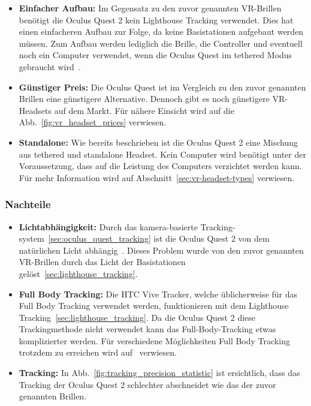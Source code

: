 \begin{itemize}
    \item \textbf{Einfacher Aufbau:} Im Gegensatz zu den zuvor genannten VR-Brillen benötigt die Oculus Quest 2 kein Lighthouse Tracking verwendet.
    Dies hat einen einfacheren Aufbau zur Folge, da keine Basistationen aufgebaut werden müssen.
    Zum Aufbau werden lediglich die Brille, die Controller und eventuell noch ein Computer verwendet, wenn die Oculus Quest im tethered Modus gebraucht wird~\cite{MECHATECH}.
    \item \textbf{Günstiger Preis:} Die Oculus Quest ist im Vergleich zu den zuvor genannten Brillen eine günstigere Alternative.
    Dennoch gibt es noch günstigere VR-Headsets auf dem Markt.
    Für nähere Einsicht wird auf die Abb.~\ref{fig:vr_headset_prices} verwiesen.
    \item \textbf{Standalone:} Wie bereits beschrieben ist die Oculus Quest 2 eine Mischung aus tethered und standalone Headset.
    Kein Computer wird benötigt unter der Voraussetzung, dass auf die Leistung des Computers verzichtet werden kann.
    Für mehr Information wird auf Abschnitt~\ref{sec:vr-headset-types} verwiesen.
\end{itemize}

\subsubsection{Nachteile}

\begin{itemize}
    \item \textbf{Lichtabhängigkeit:} Durch das kamera-basierte Tracking-system~\ref{sec:oculus_quest_tracking} ist die Oculus Quest 2 von dem natürlichen Licht abhängig~\cite{Dennis_Ziesecke_2019}.
    Dieses Problem wurde von den zuvor genannten VR-Brillen durch das Licht der Basistationen gelöst~\ref{sec:lighthouse_tracking}\cite{Dennis_Ziesecke_2019}.
    \item \textbf{Full Body Tracking:} Die HTC Vive Tracker, welche üblicherweise für das Full Body Tracking verwendet werden, funktionieren mit dem Lighthouse Tracking~\ref{sec:lighthouse_tracking}.
    Da die Oculus Quest 2 diese Trackingmethode nicht verwendet kann das Full-Body-Tracking etwas komplizierter werden.
    Für verschiedene Möglichkeiten Full Body Tracking trotzdem zu erreichen wird auf~\cite{Martin_Rakver} verwiesen.
    \item \textbf{Tracking:} In Abb.~\ref{fig:tracking_precision_statistic} ist ersichtlich, dass das Tracking der Oculus Quest 2 schlechter abschneidet wie das der zuvor genannten Brillen.
\end{itemize}

